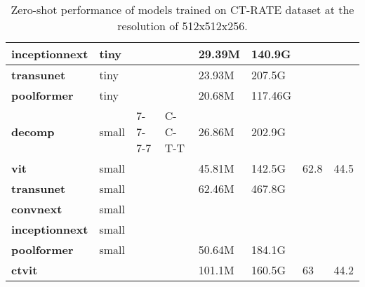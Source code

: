 \begin{table*}[t]
\begin{center}
\begin{tabular}{|l|l|l|l|l|l|l|l|}
        \textbf{inceptionnext} & tiny & ~ & ~ & 29.39M & 140.9G & ~ & ~ \\ \hline
        \textbf{transunet} & tiny & ~ & ~ & 23.93M & 207.5G & ~ & ~ \\ \hline
        \textbf{poolformer} & tiny & ~ & ~ & 20.68M & 117.46G & ~ & ~ \\ \hline        
        \textbf{decomp} & small & 7-7-7-7 & C-C-T-T & 26.86M & 202.9G & ~ & ~ \\ \hline
        \textbf{vit} & small & ~ & ~ & 45.81M & 142.5G & 62.8 & 44.5 \\ \hline
        \textbf{transunet} & small & ~ & ~ & 62.46M & 467.8G & ~ & ~ \\ \hline
        \textbf{convnext} & small & ~ & ~ & ~ & ~ & ~ & ~ \\ \hline
        \textbf{inceptionnext} & small & ~ & ~ & ~ & ~ & ~ & ~ \\ \hline
        \textbf{poolformer} & small & ~ & ~ & 50.64M & 184.1G & ~ & ~ \\ \hline
        \textbf{ctvit} & ~ & ~ & ~ & 101.1M & 160.5G & 63 & 44.2 \\ \hline
    \end{tabular}
\end{center}
\caption{\label{results} Zero-shot performance of models trained on CT-RATE dataset at the resolution of 512x512x256.}
\end{table*}
